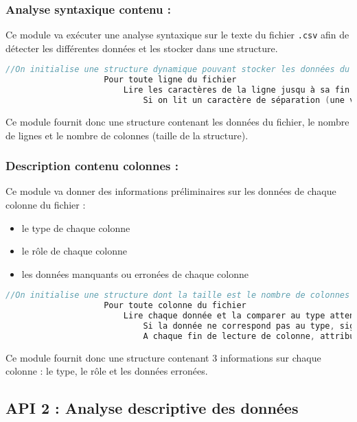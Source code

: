 			\subsubsection{Analyse syntaxique contenu :}
				Ce module va exécuter une analyse syntaxique sur le texte du fichier \lstinline!.csv! afin de détecter les différentes données et les stocker dans une structure.
				\begin{lstlisting}[language=C]
					//On initialise une structure dynamique pouvant stocker les données du fichier (tableau 2D dynamique ou liste de listes)
					Pour toute ligne du fichier
						Lire les caractères de la ligne jusqu à sa fin
							Si on lit un caractère de séparation (une virgule, un point-virgule ou une tabulation) ou une fin de ligne, on stocke les caractères lus dans la case correspondante de la structure
				\end{lstlisting}
				Ce module fournit donc une structure contenant les données du fichier, le nombre de lignes et le nombre de colonnes (taille de la structure).
				
			\subsubsection{Description contenu colonnes :}
				Ce module va donner des informations préliminaires sur les données de chaque colonne du fichier :
				\begin{itemize}
					\item le type de chaque colonne
					\item le rôle de chaque colonne
					\item les données manquants ou erronées de chaque colonne
				\end{itemize}
				\begin{lstlisting}[language=C]
					//On initialise une structure dont la taille est le nombre de colonnes qui contient 3 champs
					Pour toute colonne du fichier
						Lire chaque donnée et la comparer au type attendu
							Si la donnée ne correspond pas au type, signaler dans la structure une donnée erronée
							A chaque fin de lecture de colonne, attribuer un rôle à celle-ci
				\end{lstlisting}
				Ce module fournit donc une structure contenant 3 informations sur chaque colonne : le type, le rôle et les données erronées.

				
		\subsection{API 2 : Analyse descriptive des données}
